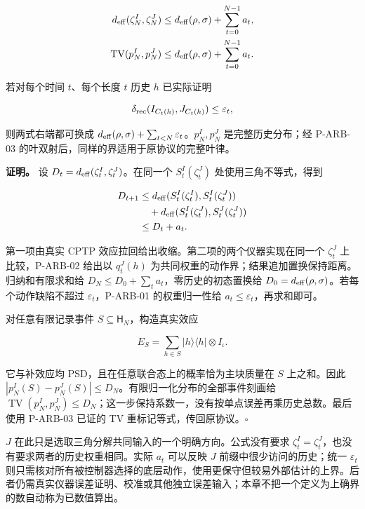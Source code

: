 \documentclass[
  11pt,
  oneside]{book}
\begin{document}
\[
\begin{aligned}
d_{\rm eff}(\zeta^I_N,\zeta^J_N)
&\le d_{\rm eff}(\rho,\sigma)+\sum_{t=0}^{N-1}a_t,\\
\operatorname{TV}(p^I_N,p^J_N)
&\le d_{\rm eff}(\rho,\sigma)+\sum_{t=0}^{N-1}a_t.
\end{aligned}
\]

若对每个时间 \(t\)、每个长度 \(t\) 历史 \(h\) 已实际证明

\[
\delta_{\rm rec}(I_{C_t(h)},J_{C_t(h)})\le\varepsilon_t,
\]

则两式右端都可换成
\(d_{\rm eff}(\rho,\sigma)+\sum_{t<N}\varepsilon_t\)。\(p^I_N,p^J_N\)
是完整历史分布；经 P-ARB-03 的叶双射后，同样的界适用于原协议的完整叶律。

\textbf{证明。} 设 \(D_t=d_{\rm eff}(\zeta^I_t,\zeta^J_t)\)。在同一个
\(S^I_t(\zeta^J_t)\) 处使用三角不等式，得到

\[
\begin{aligned}
D_{t+1}
&\le d_{\rm eff}(S^I_t(\zeta^I_t),S^I_t(\zeta^J_t))\\
&\quad+d_{\rm eff}(S^I_t(\zeta^J_t),S^J_t(\zeta^J_t))\\
&\le D_t+a_t.
\end{aligned}
\]

第一项由真实 CPTP 效应拉回给出收缩。第二项的两个仪器实现在同一个
\(\zeta^J_t\) 上比较，P-ARB-02 给出以 \(q^J_t(h)\)
为共同权重的动作界；结果追加置换保持距离。归纳和有限求和给
\(D_N\le D_0+\sum_ta_t\)，零历史的初态置换给
\(D_0=d_{\rm eff}(\rho,\sigma)\)。若每个动作缺陷不超过
\(\varepsilon_t\)，P-ARB-01 的权重归一性给
\(a_t\le\varepsilon_t\)，再求和即可。

对任意有限记录事件 \(S\subseteq\mathsf H_N\)，构造真实效应

\[
E_S=\sum_{h\in S}|h\rangle\langle h|\otimes I_\iota.
\]

它与补效应均 PSD，且在任意联合态上的概率恰为主块质量在 \(S\)
上之和。因此
\(|p^I_N(S)-p^J_N(S)|\le D_N\)。有限归一化分布的全部事件刻画给
\(\operatorname{TV}(p^I_N,p^J_N)\le D_N\)；这一步保持系数一，没有按单点误差再乘历史总数。最后使用
P-ARB-03 已证的 TV 重标记等式，传回原协议。\(\square\)

\(J\) 在此只是选取三角分解共同输入的一个明确方向。公式没有要求
\(\zeta^I_t=\zeta^J_t\)，也没有要求两者的历史权重相同。实际 \(a_t\)
可以反映 \(J\) 前缀中很少访问的历史；统一 \(\varepsilon_t\)
则只需核对所有被控制器选择的底层动作，使用更保守但较易外部估计的上界。后者仍需真实仪器误差证明、校准或其他独立误差输入；本章不把一个定义为上确界的数自动称为已数值算出。
\end{document}
